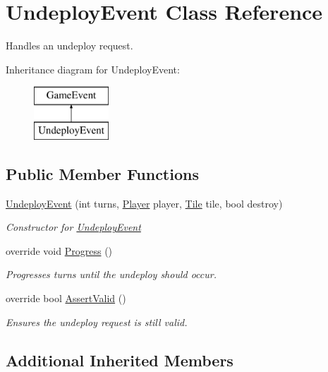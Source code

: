 \hypertarget{class_undeploy_event}{}\section{Undeploy\+Event Class Reference}
\label{class_undeploy_event}


Handles an undeploy request.  


Inheritance diagram for Undeploy\+Event\+:\begin{figure}[H]
\begin{center}
\leavevmode
\includegraphics[height=2.000000cm]{class_undeploy_event}
\end{center}
\end{figure}
\subsection*{Public Member Functions}
\begin{DoxyCompactItemize}
\item 
\hyperlink{class_undeploy_event_a6ef86b8e8ecdcdf467247955f4d7781d}{Undeploy\+Event} (int turns, \hyperlink{class_player}{Player} player, \hyperlink{class_tile}{Tile} tile, bool destroy)
\begin{DoxyCompactList}\small\item\em Constructor for \hyperlink{class_undeploy_event}{Undeploy\+Event} \end{DoxyCompactList}\item 
override void \hyperlink{class_undeploy_event_a94f9db4ee4c2a647cf9b96d9751c4285}{Progress} ()
\begin{DoxyCompactList}\small\item\em Progresses turns until the undeploy should occur. \end{DoxyCompactList}\item 
override bool \hyperlink{class_undeploy_event_a594626ee9eeebb54edf305cc6271ef8a}{Assert\+Valid} ()
\begin{DoxyCompactList}\small\item\em Ensures the undeploy request is still valid. \end{DoxyCompactList}\end{DoxyCompactItemize}
\subsection*{Additional Inherited Members}


